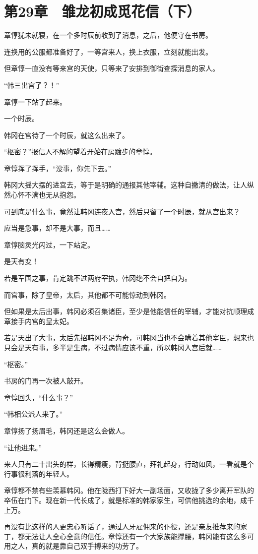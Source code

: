 \section{第29章　雏龙初成觅花信（下）}

章惇犹未就寝，在一个多时辰前收到了消息，之后，他便守在书房。

连换用的公服都准备好了，一等宫来人，换上衣服，立刻就能出发。

但章惇一直没有等来宫的天使，只等来了安排到御街查探消息的家人。

“韩三出宫了？！”

章惇一下站了起来。

一个时辰。

韩冈在宫待了一个时辰，就这么出来了。

“枢密？”报信人不解的望着开始在房踱步的章惇。

章惇挥了挥手，“没事，你先下去。”

韩冈大摇大摆的进宫去，等于是明确的通报其他宰辅。这种自撇清的做法，让人纵然心怀不满也无从抱怨。

可到底是什么事，竟然让韩冈连夜入宫，然后只留了一个时辰，就从宫出来？

应当是急事，却不是大事，而且……

章惇脑灵光闪过，一下站定。

是天有变！

若是军国之事，肯定跳不过两府宰执，韩冈绝不会自把自为。

而宫事，除了皇帝，太后，其他都不可能惊动到韩冈。

但如果是太后出事，韩冈必须召集诸臣，至少是他能信任的宰辅，才能对抗顺理成章接手内宫的皇太妃。

若是天出了大事，太后先招韩冈不足为奇，可韩冈当也不会瞒着其他宰臣，想来也只会是天有事，多半是生病，不过病情应该不重，所以韩冈入宫后就……

“枢密。”

书房的门再一次被人敲开。

章惇回头，“什么事？”

“韩相公派人来了。”

章惇扬了扬眉毛，韩冈还是这么会做人。

“让他进来。”

来人只有二十出头的样，长得精瘦，背挺腰直，拜礼起身，行动如风，一看就是个行事很利落的年轻人。

章惇都不禁有些羡慕韩冈。他在陇西打下好大一副场面，又收拢了多少离开军队的卒伍在门下。现在新一代长成了，就是标准的韩家家生，可供他挑选的余地，成千上万。

再没有比这样的人更忠心听话了，通过人牙雇佣来的仆役，还是亲友推荐来的家丁，都无法让人全心全意的信任。章惇还有一个大家族能撑腰，韩冈能有这么多可用之人，真的就是靠自己双手搏来的功劳了。

